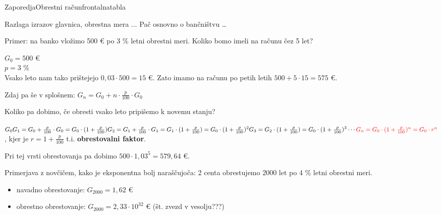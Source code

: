 \begin{priprava}{}{}{Zaporedja}{Obrestni račun}{frontalna}{tabla}


Razlaga izrazov glavnica, obrestna mera ... Pač osnovno o bančništvu \dots


Primer: na banko vložimo 500 €  po 3 \% letni obrestni meri. Koliko bomo imeli na računu čez 5 let?

$ G_0 = 500 $  € \\
$ p = 3 $ \%  \\
Vsako leto nam tako prištejejo $ 0,03 \cdot 500 = 15 $ €. Zato imamo na računu po petih letih $ 500 + 5 \cdot 15 = 575 $ €.

Zdaj pa še v splošnem: \textcolor{rdeca}{$ G_n = G_0 + n \cdot \frac{p}{100} \cdot G_0 $}


Koliko pa dobimo, če obresti vsako leto pripišemo k novemu stanju? 

$ G_0 \\
G_1 = G_0 + \frac{p}{100} \cdot G_0 = G_0 \cdot (1 + \frac{p}{100}) \\
G_2 = G_1 + \frac{p}{100} \cdot G_1 = G_1 \cdot (1 + \frac{p}{100}) = G_0 \cdot (1 + \frac{p}{100})^2 \\
G_3 = G_2 \cdot (1 + \frac{p}{100}) = G_0 \cdot (1 + \frac{p}{100})^3 \\
\cdots \\
\textcolor{rdeca}{G_n = G_0 \cdot (1 + \frac{p}{100})^n = G_0 \cdot r^n} $, kjer je $ r = 1 + \frac{p}{100} $ t.i. \textbf{obrestovalni faktor}.

Pri tej vrsti obrestovanja pa dobimo $ 500 \cdot 1,03^5 = 579,64 $ €. 

Primerjava z novčičem, kako je eksponentna bolj naraščujoča: 2 centa obrestujemo 2000 let po 4 \% letni obrestni meri.
\begin{itemize}
    \item navadno obrestovanje: $ G_{2000} = 1,62 $ €
    \item obrestno obrestovanje: $ G_{2000} = 2,33 \cdot 10^{32} $ € (št. zvezd v vesolju???)
\end{itemize}


\end{priprava}
